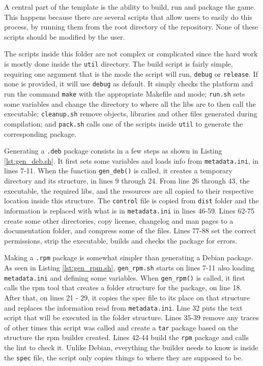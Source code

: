 A central part of the template is the ability to build, run and package the game. This happens because there are several scripts that allow users to easily do this process, by running them from the root directory of the repository. None of these scripts should be modified by the user.

The scripts inside this folder are not complex or complicated since the hard work is mostly done inside the \texttt{util} directory. The build script is fairly simple, requiring one argument that is the mode the script will run, \texttt{debug} or \texttt{release}. If none is provided, it will use \texttt{debug} as default. It simply checks the platform and run the command \texttt{make} with the appropriate Makefile and mode; \texttt{run.sh} sets some variables and change the directory to where all the libs are to then call the executable; \texttt{cleanup.sh} remove objects, libraries and other files generated during compilation; and \texttt{pack.sh} calls one of the scripts inside \texttt{util} to generate the corresponding package.

Generating a \texttt{.deb} package consists in a few steps as shown in Listing \ref{lst:gen_deb.sh}. It first sets some variables and loads info from \texttt{metadata.ini}, in lines 7-11. When the function \texttt{gen\_deb()} is called, it creates a temporary directory and its structure, in lines 9 through 24. From line 26 through 43, the executable, the required libs, and the resources are all copied to their respective location inside this structure. The \texttt{control} file is copied from \texttt{dist} folder and the information is replaced with what is in \texttt{metadata.ini} in lines 46-59. Lines 62-75 create some other directories, copy license, changelog and man pages to a documentation folder, and compress some of the files. Lines 77-88 set the correct permissions, strip the executable, builds and checks the package for errors.



Making a \texttt{.rpm} package is somewhat simpler than generating a Debian package. As seen in Listing \ref{lst:gen_rpm.sh}, \texttt{gen\_rpm.sh} starts on lines 7-11 also loading \texttt{metadata.ini} and defining some variables. When \texttt{gen\_rpm()} is called, it first calls the rpm tool that creates a folder structure for the package, on line 18. After that, on lines 21 - 29, it copies the spec file to its place on that structure and replaces the information read from \texttt{metadata.ini}. Line 32 puts the text script that will be executed in the folder structure. Lines 35-39 remove any traces of other times this script was called and create a \texttt{tar} package based on the structure the rpm builder created. Lines 42-44 build the \texttt{rpm} package and calls the lint to check it. Unlike Debian, everything the builder needs to know is inside the \texttt{spec} file, the script only copies things to where they are supposed to be.

